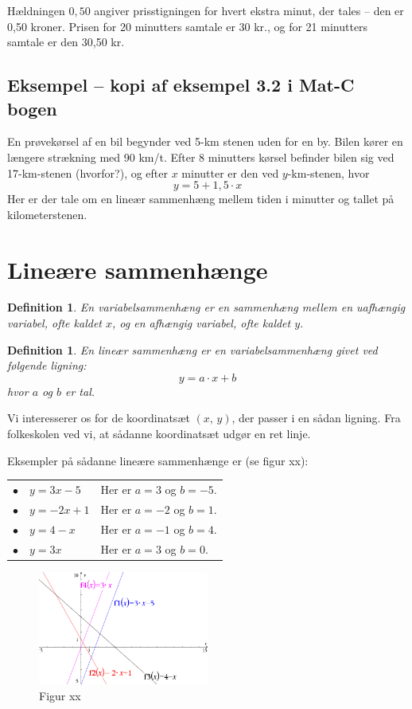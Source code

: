 \documentclass[12pt,oneside,a4paper]{article}
\newtheorem{mydef}[thm]{Definition}
\begin{document}
Hældningen $0,50$ angiver prisstigningen for hvert ekstra minut, der tales --
den er 0,50 kroner.  Prisen for 20 minutters samtale er 30 kr., og for 21
minutters samtale er den 30,50 kr.

\subsection{Eksempel -- kopi af eksempel 3.2 i Mat-C bogen}
En prøvekørsel af en bil begynder ved 5-km stenen uden for en by. Bilen kører
en længere strækning med 90 km/t. Efter 8 minutters kørsel befinder bilen sig
ved 17-km-stenen (hvorfor?), og efter $x$ minutter er den ved $y$-km-stenen,
hvor
$$
y = 5 + 1,5\cdot x
$$
Her er der tale om en lineær sammenhæng mellem tiden i minutter og tallet på
kilometerstenen.

\section{Lineære sammenhænge}
\begin{mydef}
    En variabelsammenhæng er en sammenhæng mellem en uafhængig variabel, ofte
    kaldet $x$, og en afhængig variabel, ofte kaldet $y$.
\end{mydef}

\begin{mydef}
    En lineær sammenhæng er en variabelsammenhæng givet ved følgende ligning:
    $$
    y = a\cdot x + b
    $$
    hvor $a$ og $b$ er tal.
\end{mydef}

Vi interesserer os for de koordinatsæt $(x,\,y)$, der passer i en sådan ligning.
Fra folkeskolen ved vi, at sådanne koordinatsæt udgør en ret linje.

Eksempler på sådanne lineære sammenhænge er (se figur xx):

\begin{tabular}{ll}
    $\bullet\quad y=3x-5$  & Her er $a=3$ og $b=-5$. \\
    $\bullet\quad y=-2x+1$ & Her er $a=-2$ og $b=1$. \\
    $\bullet\quad y=4-x$   & Her er $a=-1$ og $b=4$. \\
    $\bullet\quad y=3x$    & Her er $a=3$ og $b=0$.
\end{tabular}

\begin{figure}[ht]
    \centering
    \includegraphics[width=0.5\textwidth]{fig-def-22}
    \caption{Figur xx}
    \label{fig-def-22}
\end{figure}
\end{document}
